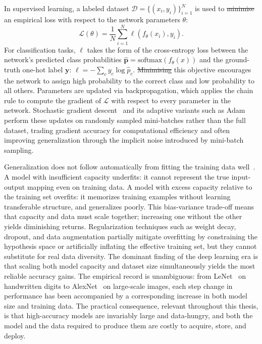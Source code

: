 \documentclass[12pt, a4paper, twoside]{book}
\makeatletter
\numberwithin{equation}{chapter}
\theoremstyle{plain}
\theoremstyle{definition}
\theoremstyle{remark}
\newenvironment{foldable}{}{}
\providecommand{\DIFaddtex}[1]{{\protect\color{blue}\uwave{#1}}} %
\providecommand{\DIFdeltex}[1]{{\protect\color{red}\sout{#1}}} %
\providecommand{\DIFaddbegin}{} %
\providecommand{\DIFaddend}{} %
\providecommand{\DIFdelbegin}{} %
\providecommand{\DIFdelend}{} %
\providecommand{\DIFadd}[1]{\texorpdfstring{\DIFaddtex{#1}}{#1}} %
\providecommand{\DIFdel}[1]{\texorpdfstring{\DIFdeltex{#1}}{}} %
\newcommand{\DIFscaledelfig}{0.5}
\newlength{\DIFdelgraphicswidth} %
\newlength{\DIFdelgraphicsheight} %
\newcommand{\DIFaddincludegraphics}[2][]{{\color{blue}\fbox{\DIFOincludegraphics[#1]{#2}}}} %
\newcommand{\DIFdelincludegraphics}[2][]{%
\sbox{\DIFdelgraphicsbox}{\DIFOincludegraphics[#1]{#2}}%
\settoboxwidth{\DIFdelgraphicswidth}{\DIFdelgraphicsbox} %
\settoboxtotalheight{\DIFdelgraphicsheight}{\DIFdelgraphicsbox} %
\scalebox{\DIFscaledelfig}{%
\parbox[b]{\DIFdelgraphicswidth}{\usebox{\DIFdelgraphicsbox}\\[-\baselineskip] \rule{\DIFdelgraphicswidth}{0em}}\llap{\resizebox{\DIFdelgraphicswidth}{\DIFdelgraphicsheight}{%
\setlength{\unitlength}{\DIFdelgraphicswidth}%
\begin{picture}(1,1)%
\thicklines\linethickness{2pt} %
{\color[rgb]{1,0,0}\put(0,0){\framebox(1,1){}}}%
{\color[rgb]{1,0,0}\put(0,0){\line( 1,1){1}}}%
{\color[rgb]{1,0,0}\put(0,1){\line(1,-1){1}}}%
\end{picture}%
}\hspace*{3pt}}} %
} %
\DeclareRobustCommand{\DIFaddbegin}{\DIFOaddbegin \let\includegraphics\DIFaddincludegraphics} %
\DeclareRobustCommand{\DIFaddend}{\DIFOaddend \let\includegraphics\DIFOincludegraphics} %
\DeclareRobustCommand{\DIFdelbegin}{\DIFOdelbegin \let\includegraphics\DIFdelincludegraphics} %
\DeclareRobustCommand{\DIFdelend}{\DIFOaddend \let\includegraphics\DIFOincludegraphics} %
\let\sout@orig\sout %
\renewcommand{\sout}[1]{\ifmmode\text{\sout@orig{\ensuremath{#1}}}\else\sout@orig{#1}\fi} %
\makeatother
\begin{document}
\begin{foldable}
  In supervised learning, a labeled dataset $\mathcal{D} = \{(x_i, y_i)\}_{i=1}^{N}$ is used to \DIFdelbegin \DIFdel{minimise }\DIFdelend \DIFaddbegin \DIFadd{minimize }\DIFaddend an empirical loss with respect to the network parameters $\theta$:
  \begin{equation}
    \label{eq:21-background-deeplearning-loss-supervised}
    \mathcal{L}(\theta) = \frac{1}{N}\sum_{i=1}^{N} \ell(f_{\theta}(x_i), y_i).
  \end{equation}
  For classification tasks, $\ell$ takes the form of the cross-entropy loss between the network's predicted class probabilities $\hat{\mathbf{p}} = \text{softmax}(f_\theta(x))$ and the ground-truth one-hot label $\mathbf{y}$: $\ell = -\sum_c y_c \log \hat{p}_c$.
  \DIFdelbegin \DIFdel{Minimising }\DIFdelend \DIFaddbegin \DIFadd{Minimizing }\DIFaddend this objective encourages the network to assign high probability to the correct class and low probability to all others.
  Parameters are updated via backpropagation, which applies the chain rule to compute the gradient of $\mathcal{L}$ with respect to every parameter in the network.
  Stochastic gradient descent~\cite{robbins1951stochastic} and its adaptive variants such as Adam~\cite{kingma2014adam} perform these updates on randomly sampled mini-batches rather than the full dataset, trading gradient accuracy for computational efficiency and often improving generalization through the implicit noise introduced by mini-batch sampling.
\end{foldable}

\begin{foldable}
  Generalization does not follow automatically from fitting the training data well~\cite{zhang2017understanding}.
  A model with insufficient capacity underfits: it cannot represent the true input-output mapping even on training data.
  A model with excess capacity relative to the training set overfits: it memorizes training examples without learning transferable structure, and generalizes poorly.
  This bias-variance trade-off means that capacity and data must scale together; increasing one without the other yields diminishing returns.
  Regularization techniques such as weight decay, dropout, and data augmentation partially mitigate overfitting by constraining the hypothesis space or artificially inflating the effective training set, but they cannot substitute for real data diversity.
  The dominant finding of the deep learning era is that scaling both model capacity and dataset size simultaneously yields the most reliable accuracy gains.
  The empirical record is unambiguous: from LeNet~\cite{lecun1998gradient} on handwritten digits to AlexNet~\cite{krizhevsky2012imagenet} on large-scale images, each step change in performance has been accompanied by a corresponding increase in both model size and training data.
  The practical consequence, relevant throughout this thesis, is that high-accuracy models are invariably large and data-hungry, and both the model and the data required to produce them are costly to acquire, store, and deploy.
\end{foldable}
\end{document}
